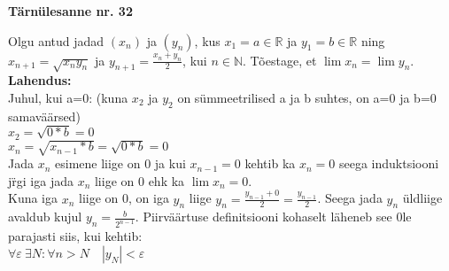\documentclass{article}
\begin{document}
\begin{center}
\Large\textbf{T\"arn\"ulesanne nr. 32}\\
\end{center}
Olgu antud jadad $(x_n)$ ja $(y_n)$, kus $x_1=a\in\mathbb{R}$ ja $y_1=b\in\mathbb{R}$ ning $x_{n+1}=\sqrt{x_n y_n}$ ja $y_{n+1}=\frac{x_n+y_n}{2}$, kui $n\in\mathbb{N}$. T\~oestage, et $\lim x_n=\lim y_n$.\\
\textbf{Lahendus:}\\
Juhul, kui a=0: (kuna $x_2$ ja $y_2$ on s\"ummeetrilised a ja b suhtes, on a=0 ja b=0 samav\"a\"arsed)\\
$x_2=\sqrt{0*b}=0$\\
$x_n=\sqrt{x_{n-1}*b}=\sqrt{0*b}=0$\\
Jada $x_n$ esimene liige on 0 ja kui $x_{n-1}=0$ kehtib ka $x_n=0$ seega induktsiooni j\"rgi iga jada $x_n$ liige on 0 ehk ka $\lim x_n=0$.\\
Kuna iga $x_n$ liige on 0, on iga $y_n$ liige $y_n=\frac{y_{n-1}+0}{2}=\frac{y_{n-1}}{2}$. Seega jada $y_n$ \"uldliige avaldub kujul $y_n=\frac{b}{2^{n-1}}$. Piirv\"a\"artuse definitsiooni kohaselt l\"aheneb see 0le parajasti siis, kui kehtib:\\
$\forall\varepsilon\ \exists N: \forall n>N\quad |y_N|<\varepsilon$ 
\end{document}
